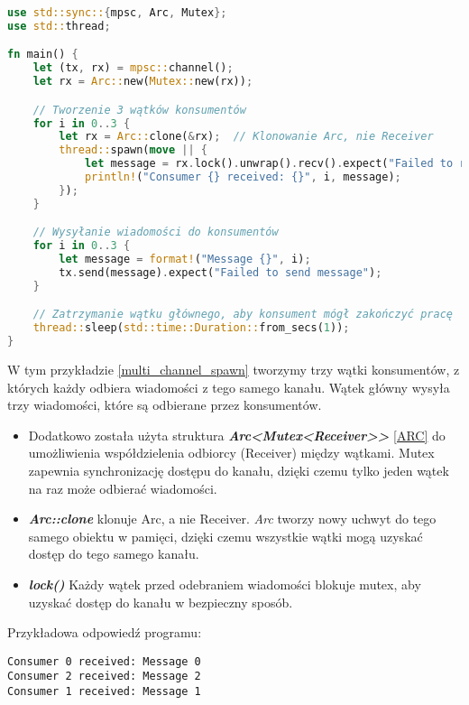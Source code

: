 \begin{lstlisting}[language=Rust, caption=Przykład z wieloma wątkami, label=multi_channel_spawn]
use std::sync::{mpsc, Arc, Mutex};
use std::thread;

fn main() {
    let (tx, rx) = mpsc::channel();
    let rx = Arc::new(Mutex::new(rx));

    // Tworzenie 3 wątków konsumentów
    for i in 0..3 {
        let rx = Arc::clone(&rx);  // Klonowanie Arc, nie Receiver
        thread::spawn(move || {
            let message = rx.lock().unwrap().recv().expect("Failed to receive message");
            println!("Consumer {} received: {}", i, message);
        });
    }

    // Wysyłanie wiadomości do konsumentów
    for i in 0..3 {
        let message = format!("Message {}", i);
        tx.send(message).expect("Failed to send message");
    }

    // Zatrzymanie wątku głównego, aby konsument mógł zakończyć pracę
    thread::sleep(std::time::Duration::from_secs(1));
}

\end{lstlisting}
W tym przykładzie \ref{multi_channel_spawn} tworzymy trzy wątki konsumentów, z których każdy odbiera wiadomości z tego samego kanału. Wątek główny wysyła trzy wiadomości, które są odbierane przez konsumentów.
\begin{itemize}
    \item Dodatkowo została użyta struktura \textbf{\textit{Arc<Mutex<Receiver>>}} \ref{ARC} do umożliwienia współdzielenia odbiorcy (Receiver) między wątkami. Mutex zapewnia synchronizację dostępu do kanału, dzięki czemu tylko jeden wątek na raz może odbierać wiadomości.
    \item \textbf{\textit{Arc::clone}} klonuje Arc, a nie Receiver. \textit{Arc} tworzy nowy uchwyt do tego samego obiektu w pamięci, dzięki czemu wszystkie wątki mogą uzyskać dostęp do tego samego kanału.
    \item \textbf{\textit{lock()}} Każdy wątek przed odebraniem wiadomości blokuje mutex, aby uzyskać dostęp do kanału w bezpieczny sposób.
\end{itemize}
Przykładowa odpowiedź programu:
\begin{verbatim}
Consumer 0 received: Message 0
Consumer 2 received: Message 2
Consumer 1 received: Message 1
\end{verbatim}

